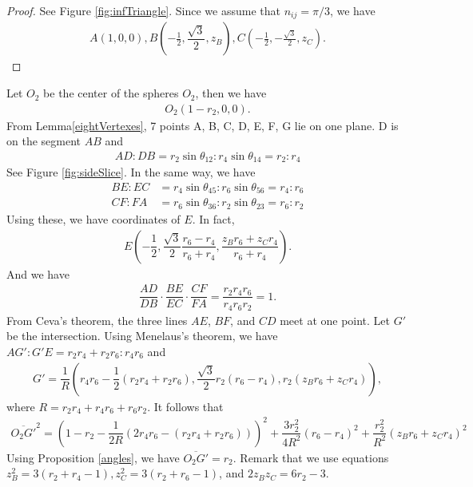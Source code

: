 \documentclass[suppldata, dvipdfmx]{interact}
\theoremstyle{plain}%
\theoremstyle{definition}
\theoremstyle{remark}
\theoremstyle{problemstyle}
\begin{document}
\begin{proof}
See Figure \ref{fig:infTriangle}. Since we assume that $n_{ij} = \pi/3$, we have
\begin{align*}
 A(1, 0, 0), B(-\frac{1}{2}, \dfrac{\sqrt{3}}{2}, z_B), C(-\frac{1}{2}, -\frac{\sqrt{3}}{2}, z_C).
\end{align*}
\end{proof}

Let $O_2$ be the center of the spheres $O_2$, then we have
\begin{align*}
 O_2(1 - r_2, 0, 0).
\end{align*}
From Lemma\ref{eightVertexes}, 7 points A, B, C, D, E, F, G lie on one plane. D is on
the segment $AB$ and
\begin{align*}
 AD : DB = r_2\sin\theta_{12} : r_4\sin\theta_{14} = r_2 : r_4
\end{align*}
See Figure \ref{fig:sideSlice}. In the same way, we have
\begin{align*}
 BE : EC &= r_4\sin\theta_{45} : r_6\sin\theta_{56} = r_4:r_6\\
 CF : FA &= r_6\sin\theta_{36} : r_2\sin\theta_{23} = r_6:r_2
\end{align*}
Using these, we have coordinates of $E$. In fact,
\begin{align*}
 E(-\dfrac{1}{2},\dfrac{\sqrt{3}}{2}\dfrac{r_6-r_4}{r_6 + r_4},
 \dfrac{z_Br_6 + z_C r_4}{r_6 + r_4}).
\end{align*}
And we have
\begin{align*}
 \dfrac{AD}{DB} \cdot \dfrac{BE}{EC} \cdot \dfrac{CF}{FA} = \dfrac{r_2r_4r_6}{r_4r_6r_2} = 1.
\end{align*}
From Ceva's theorem, the three lines $AE$, $BF$, and $CD$ meet at one
point. Let $G'$ be the intersection. Using Menelaus's theorem, we have
$AG':G'E = r_2r_4 + r_2r_6:r_4r_6$ and
\begin{align*}
 G' = \dfrac{1}{R}(r_4r_6 - \dfrac{1}{2}(r_2r_4 + r_2r_6), 
 \dfrac{\sqrt{3}}{2}r_2(r_6 - r_4), r_2(z_Br_6 + z_Cr_4)),
\end{align*}
where $R = r_2r_4 + r_4r_6 + r_6r_2.$ It follows that
\begin{align*}
 \overline{O_2G'}^2 = (1 - r_2 - \dfrac{1}{2R}(2r_4r_6 - (r_2r_4 +
 r_2r_6)))^2 + \dfrac{3r^2_2}{4R^2}(r_6 - r_4)^2 +
 \dfrac{r_2^2}{R^2}(z_Br_6 + z_Cr_4)^2
\end{align*}
Using Proposition \ref{angles}, we have $\overline{O_2G'} = r_2$.
Remark that we
use equations $z_B^2 = 3(r_2 + r_4 - 1), z_C^2 = 3(r_2 + r_6 - 1)$, and
$2z_Bz_C = 6r_2 - 3$.
\end{document}
